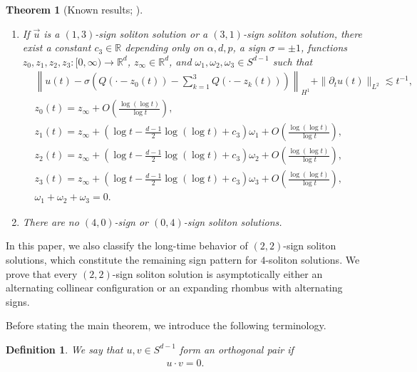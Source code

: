 \documentclass[10pt,a4paper]{amsart}
\newtheorem{theorem}{Theorem}[section]
\newtheorem{definition}{Definition}[section]
\numberwithin{equation}{section}
\begin{document}
\begin{theorem}[Known results; \cite{CD,CMYZ,I2,I3}]
\begin{enumerate}
\item If $\vec{u}$ is a $(1,3)$-sign soliton solution or a $(3,1)$-sign soliton solution, there exist a constant $c_3\in \mathbb{R}$ depending only on $\alpha,d,p$, a sign $\sigma=\pm 1$, functions $z_0,z_1,z_2,z_3:[0,\infty)\to\mathbb{R}^d$, $z_{\infty}\in \mathbb{R}^d$, and $\omega_1,\omega_2,\omega_3\in S^{d-1}$ such that
\begin{align*}
&\left\| u(t)-\sigma\left(Q(\cdot-z_0(t))-\sum_{k=1}^3Q(\cdot-z_k(t))\right)\right\|_{H^1}+\|{\partial}_tu(t)\|_{L^2}\lesssim t^{-1},
\\
&z_0(t)=z_{\infty}+O\left(\frac{\log{(\log{t})}}{\log{t}}\right),
\\
&z_1(t)=z_{\infty}+\left(\log{t}-\frac{d-1}{2}\log{(\log{t})}+c_3\right)\omega_1+O\left(\frac{\log{(\log{t})}}{\log{t}}\right),
\\
&z_2(t)=z_{\infty}+\left(\log{t}-\frac{d-1}{2}\log{(\log{t})}+c_3\right)\omega_2+O\left(\frac{\log{(\log{t})}}{\log{t}}\right),
\\
&z_3(t)=z_{\infty}+\left(\log{t}-\frac{d-1}{2}\log{(\log{t})}+c_3\right)\omega_3+O\left(\frac{\log{(\log{t})}}{\log{t}}\right),
\\
&\omega_1+\omega_2+\omega_3=0.
\end{align*}

\item There are no $(4,0)$-sign or $(0,4)$-sign soliton solutions.
\end{enumerate}
\end{theorem}

In this paper, we also classify the long-time behavior of $(2,2)$-sign soliton solutions, which constitute the remaining sign pattern for $4$-soliton solutions. We prove that every $(2,2)$-sign soliton solution is asymptotically either an alternating collinear configuration or an expanding rhombus with alternating signs.

Before stating the main theorem, we introduce the following terminology.

\begin{definition}
We say that $u,v\in S^{d-1}$ form an \textit{orthogonal pair} if
\begin{align*}
u\cdot v=0.
\end{align*}
\end{definition}
\end{document}
